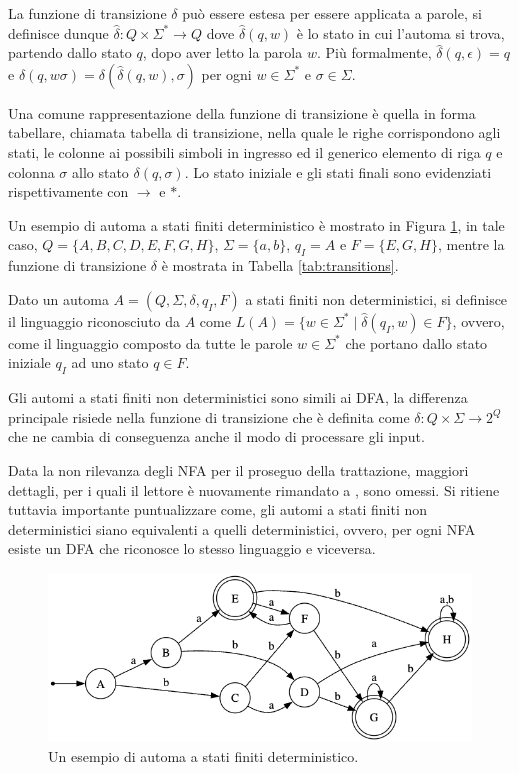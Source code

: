 \documentclass[a4paper,12pt]{report}
\begin{document}
La funzione di transizione $\delta$ può essere estesa per essere applicata a parole, si definisce dunque $\hat{\delta}: Q \times \Sigma^* \rightarrow Q$ dove $\hat{\delta}(q, w)$
è lo stato in cui l'automa si trova, partendo dallo stato $q$, dopo aver letto la parola $w$. Più formalmente, $\hat{\delta}(q, \epsilon) = q$ e $\hat{\delta}(q, w\sigma) = \delta(\hat{\delta}(q, w), \sigma)$ per ogni $w \in \Sigma^*$ e $\sigma \in \Sigma$.

Una comune rappresentazione della funzione di transizione è quella in forma tabellare, chiamata tabella di transizione, nella quale le righe
corrispondono agli stati, le colonne ai possibili simboli in ingresso ed il generico elemento di riga $q$ e colonna $\sigma$ allo stato $\delta(q, \sigma)$. Lo stato iniziale e gli stati finali sono evidenziati rispettivamente con $\rightarrow$ e $*$.

Un esempio di automa a stati finiti deterministico è mostrato in Figura \ref{fig:dfa}, in tale caso, $Q = \{A, B, C, D, E, F, G, H\}$, $\Sigma = \{a, b\}$, $q_I = A$ e $F = \{E, G, H\}$, mentre
la funzione di transizione $\delta$ è mostrata in Tabella \ref{tab:transitions}.

Dato un automa $A = (Q, \Sigma, \delta, q_I, F)$ a stati finiti non deterministici, si definisce il linguaggio riconosciuto da $A$ come 
$L(A) = \{w \in \Sigma^* \mid \hat{\delta}(q_I, w) \in F\}$, ovvero, come il linguaggio composto da tutte le parole $w \in \Sigma^*$ che portano dallo
stato iniziale $q_I$ ad uno stato $q \in F$.

Gli automi a stati finiti non deterministici sono simili ai DFA, la differenza principale risiede nella funzione di transizione che è definita come $\delta: Q \times \Sigma \rightarrow 2^Q$ che ne cambia di conseguenza anche il modo di processare gli input.

Data la non rilevanza degli NFA per il proseguo della trattazione, maggiori dettagli, per i quali il lettore è nuovamente rimandato a \cite{HMU06}, sono omessi. Si ritiene tuttavia importante 
puntualizzare come, gli automi a stati finiti non deterministici siano equivalenti a quelli deterministici, ovvero, per ogni NFA esiste un DFA che riconosce lo stesso linguaggio e viceversa.

\begin{figure}[!htb]
  \centering
  \includegraphics[width=0.7\linewidth]{dfa.png}
  \caption{\label{fig:dfa}Un esempio di automa a stati finiti deterministico.}
\end{figure}
\end{document}
